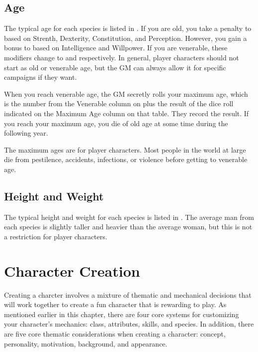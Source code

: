     \subsection{Age}
        The typical age for each species is listed in .
        If you are old, you take a  penalty to  based on Strenth, Dexterity, Constitution, and Perception.
        However, you gain a  bonus to  based on Intelligence and Willpower.
        If you are venerable, these modifiers change to  and  respectively.
        In general, player characters should not start as old or venerable age, but the GM can always allow it for specific campaigns if they want.

        When you reach venerable age, the GM secretly rolls your maximum age, which is the number from the Venerable column on  plus the result of the dice roll indicated on the Maximum Age column on that table.
        They record the result.
        If you reach your maximum age, you die of old age at some time during the following year.

        The maximum ages are for player characters. Most people in the world at large die from pestilence, accidents, infections, or violence before getting to venerable age.

    \subsection{Height and Weight}
        The typical height and weight for each species is listed in .
        The average man from each species is slightly taller and heavier than the average woman, but this is not a restriction for player characters.

\section{Character Creation}\label{Character Creation}

    Creating a charcter involves a mixture of thematic and mechanical decisions that will work together to create a fun character that is rewarding to play.
    As mentioned earlier in this chapter, there are four core systems for customizing your character's mechanics: class, attributes, skills, and species.
    In addition, there are five core thematic considerations when creating a character: concept, personality, motivation, background, and appearance.

